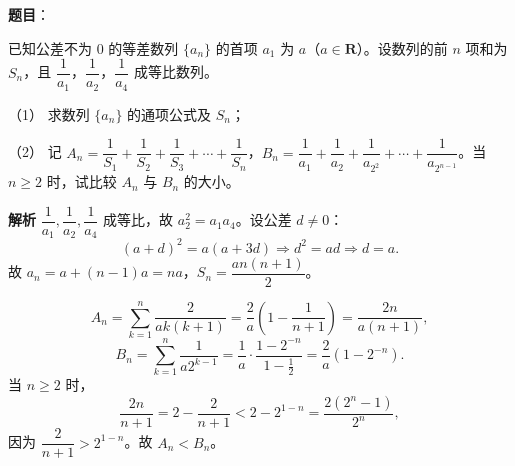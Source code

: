 \begin{answer}

\textbf{题目}：

已知公差不为 $0$ 的等差数列 $\{a_n\}$ 的首项 $a_1$ 为 $a$（$a\in\mathbf R$）。设数列的前 $n$ 项和为 $S_n$，且 $\dfrac1{a_1}$，$\dfrac1{a_2}$，$\dfrac1{a_4}$ 成等比数列。

（1） 求数列 $\{a_n\}$ 的通项公式及 $S_n$；

（2） 记 $A_n=\dfrac1{S_1}+\dfrac1{S_2}+\dfrac1{S_3}+\cdots+\dfrac1{S_n}$，$B_n=\dfrac1{a_1}+\dfrac1{a_2}+\dfrac1{a_{2^2}}+\cdots+\dfrac1{a_{2^{n-1}}}$。当 $n\geqslant2$ 时，试比较 $A_n$ 与 $B_n$ 的大小。

\textbf{解析}
$\dfrac1{a_1},\dfrac1{a_2},\dfrac1{a_4}$ 成等比，故 $a_2^2=a_1a_4$。设公差 $d\neq0$：
\nopagebreak[4]
\[(a+d)^2=a(a+3d)\Longrightarrow d^2=ad\Longrightarrow d=a.\]
故 $a_n=a+(n-1)a=na$，$S_n=\dfrac{a n(n+1)}2$。

\nopagebreak[4]
\[A_n=\sum_{k=1}^n\frac{2}{ak(k+1)}=\frac2a\left(1-\frac1{n+1}\right)=\frac{2n}{a(n+1)},\]
\nopagebreak[4]
\[B_n=\sum_{k=1}^n\frac1{a2^{k-1}}=\frac1a\cdot\frac{1-2^{-n}}{1-\frac12}=\frac2a(1-2^{-n}).\]
当 $n\geqslant2$ 时，
\nopagebreak[4]
\[\frac{2n}{n+1}=2-\frac2{n+1}<2-2^{1-n}=\frac{2(2^n-1)}{2^n},\]
因为 $\dfrac2{n+1}>2^{1-n}$。故 $A_n<B_n$。



\end{answer}
